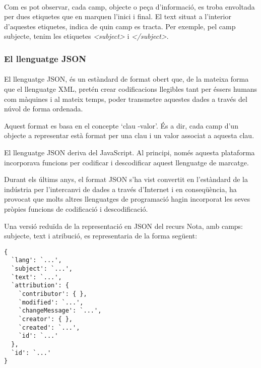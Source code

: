         \paragraph{}
        Com es pot observar, cada camp, objecte o peça d'informació, es troba envoltada per dues etiquetes que en marquen l'inici i final. El text situat a l'interior d'aquestes etiquetes, indica de quin camp es tracta. Per exemple, pel camp subjecte, tenim les etiquetes \emph{<subject>} i \emph{</subject>}.


        \subsubsection{El llenguatge JSON}

        \paragraph{}
        El llenguatge \gls{JSON}, és un estàndard de format obert que, de la mateixa forma que el llenguatge XML, pretén crear codificacions llegibles tant per éssers humans com màquines i al mateix temps, poder transmetre aquestes dades a través del núvol de forma ordenada.

        Aquest format es basa en el concepte ‘clau -valor’. És a dir, cada camp d'un objecte a representar està format per una clau i un valor associat a aquesta clau.

        El llenguatge JSON deriva del JavaScript. Al principi, només aquesta plataforma incorporava funcions per codificar i descodificar aquest llenguatge de marcatge.

        Durant els últims anys, el format JSON s'ha vist convertit en l'estàndard de la indústria per l'intercanvi de dades a través d'Internet i en conseqüència, ha provocat que molts altres llenguatges de programació hagin incorporat les seves pròpies funcions de codificació i descodificació.

        Una versió reduïda de la representació en JSON del recurs Nota, amb camps: subjecte, text i atribució, es representaria de la forma següent:

        \begin{lstlisting}[style=rawOwn,caption={Representació bàsica en JSON d'una Nota}]
{
  `lang': `...',
  `subject': `...',
  `text': `...',
  `attribution': {
    `contributor': { },
    `modified': `...',
    `changeMessage': `...',
    `creator': { },
    `created': `...',
    `id': `...'
  },
  `id': `...'
}
        \end{lstlisting}
